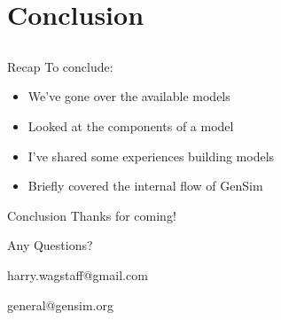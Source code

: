 \section{Conclusion}
\subsection{}

\begin{frame}{Recap}
To conclude:
\begin{itemize}
\item We've gone over the available models
\item Looked at the components of a model
\item I've shared some experiences building models
\item Briefly covered the internal flow of GenSim
\end{itemize}
\end{frame}

\begin{frame}{Conclusion}
	\centering
	Thanks for coming!
	
	\footnotesize{Any Questions?}
	
	\bigskip
	
	harry.wagstaff@gmail.com
	
	general@gensim.org
\end{frame}
